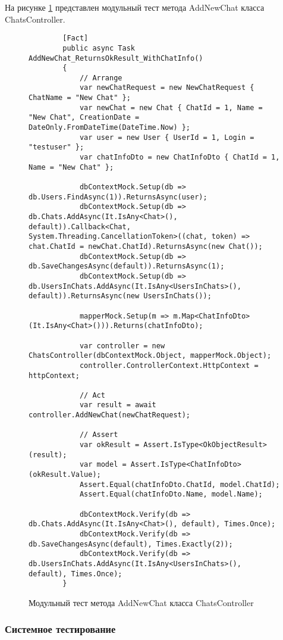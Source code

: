 На рисунке \ref{unitAddNewChat:image} представлен модульный тест метода AddNewChat класса ChatsController.

\begin{figure}[H]
	\begin{lstlisting}
		[Fact]
		public async Task AddNewChat_ReturnsOkResult_WithChatInfo()
		{
			// Arrange
			var newChatRequest = new NewChatRequest { ChatName = "New Chat" };
			var newChat = new Chat { ChatId = 1, Name = "New Chat", CreationDate = DateOnly.FromDateTime(DateTime.Now) };
			var user = new User { UserId = 1, Login = "testuser" };
			var chatInfoDto = new ChatInfoDto { ChatId = 1, Name = "New Chat" };
			
			dbContextMock.Setup(db => db.Users.FindAsync(1)).ReturnsAsync(user);
			dbContextMock.Setup(db => db.Chats.AddAsync(It.IsAny<Chat>(), default)).Callback<Chat, System.Threading.CancellationToken>((chat, token) => chat.ChatId = newChat.ChatId).ReturnsAsync(new Chat());
			dbContextMock.Setup(db => db.SaveChangesAsync(default)).ReturnsAsync(1);
			dbContextMock.Setup(db => db.UsersInChats.AddAsync(It.IsAny<UsersInChats>(), default)).ReturnsAsync(new UsersInChats());
			
			mapperMock.Setup(m => m.Map<ChatInfoDto>(It.IsAny<Chat>())).Returns(chatInfoDto);
			
			var controller = new ChatsController(dbContextMock.Object, mapperMock.Object);
			controller.ControllerContext.HttpContext = httpContext;
			
			// Act
			var result = await controller.AddNewChat(newChatRequest);
			
			// Assert
			var okResult = Assert.IsType<OkObjectResult>(result);
			var model = Assert.IsType<ChatInfoDto>(okResult.Value);
			Assert.Equal(chatInfoDto.ChatId, model.ChatId);
			Assert.Equal(chatInfoDto.Name, model.Name);
			
			dbContextMock.Verify(db => db.Chats.AddAsync(It.IsAny<Chat>(), default), Times.Once);
			dbContextMock.Verify(db => db.SaveChangesAsync(default), Times.Exactly(2));
			dbContextMock.Verify(db => db.UsersInChats.AddAsync(It.IsAny<UsersInChats>(), default), Times.Once);
		}
	\end{lstlisting}
	\caption{Модульный тест метода AddNewChat класса ChatsController}
	\label{unitAddNewChat:image}
\end{figure}

\subsubsection{Системное тестирование}

